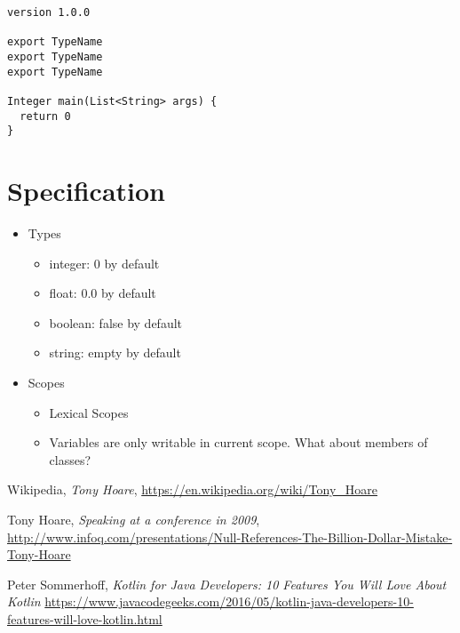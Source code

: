 \documentclass[a4paper,12pt]{article}
\begin{document}
\begin{verbatim}
version 1.0.0

export TypeName
export TypeName
export TypeName

Integer main(List<String> args) {
  return 0
}
\end{verbatim}

\section{Specification}
\begin{itemize}
	\item Types
  	\begin{itemize}
  		\item integer: 0 by default
  		\item float: 0.0 by default
  		\item boolean: false by default
  		\item string: empty by default
  	\end{itemize} 
  	\item Scopes
  	\begin{itemize}
  		\item Lexical Scopes
  		\item Variables are only writable in current scope. What about members of classes?
  	\end{itemize}
\end{itemize}

\newpage
\begin{thebibliography}{56}
	Wikipedia,
	\emph{Tony Hoare},
	\url{https://en.wikipedia.org/wiki/Tony_Hoare}
	
	Tony Hoare,
	\emph{Speaking at a conference in 2009},
	\url{http://www.infoq.com/presentations/Null-References-The-Billion-Dollar-Mistake-Tony-Hoare}
	
 	Peter Sommerhoff,
 	\emph{Kotlin for Java Developers: 10 Features You Will Love About Kotlin}
 	\url{https://www.javacodegeeks.com/2016/05/kotlin-java-developers-10-features-will-love-kotlin.html}
\end{thebibliography}
\end{document}

